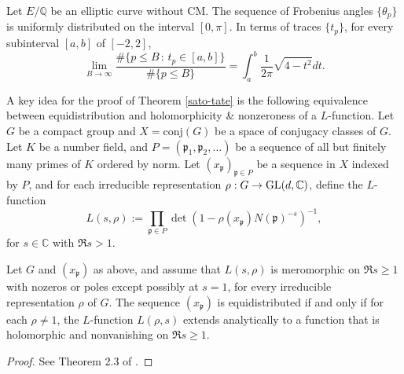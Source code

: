 \begin{theorem}
\label{sato-tate}
Let $E/\mathbb{Q}$ be an elliptic curve without CM.
The sequence of Frobenius angles $\{\theta_{p}\}$ is uniformly distributed on the
interval $[0, \pi]$. In terms of traces $\{t_{p}\}$, for every subinterval $[a, b]$ of $[-2, 2]$,
$$
\lim_{B\to \infty} \frac{\#\{p\leq B\,:\, t_{p} \in [a, b]\}}{\#\{p\leq B\}} = \int_{a}^{b} \frac{1}{2\pi} \sqrt{4 - t^{2}} dt.
$$
\end{theorem}

A key idea for the proof of Theorem \ref{sato-tate} is the following equivalence between 
equidistribution and holomorphicity \& nonzeroness of a $L$-function.
Let $G$ be a compact group and $X = \mathrm{conj}(G)$ be a space of
conjugacy classes of $G$. Let $K$ be a number field, and $P = (\mathfrak{p}_{1}, \mathfrak{p}_{2}, \dots)$
be a sequence of all but finitely many primes of $K$ ordered by norm.
Let $(x_{\mathfrak{p}})_{\mathfrak{p}\in P}$ be a sequence in $X$ indexed by $P$, and for each
irreducible representation $\rho: G \to \operatorname{\mathrm{GL}}(d, \mathbb{C})$, define the $L$-function
$$
L(s, \rho) := \prod_{\mathfrak{p}\in P} \det(1 - \rho(x_{\mathfrak{p}})N(\mathfrak{p})^{-s})^{-1},
$$
for $s\in \mathbb{C}$ with $\Re s > 1$.

\begin{theorem}
\label{equidistribution}
Let $G$ and $(x_{\mathfrak{p}})$ as above, and assume that $L(s, \rho)$ is meromorphic on $\Re s \geq 1$
with nozeros or poles except possibly at $s=1$, for every irreducible representation $\rho$ of $G$.
The sequence $(x_{\mathfrak{p}})$ is equidistributed if and only if for each $\rho \neq 1$, the $L$-function
$L(\rho, s)$ extends analytically to a function that is holomorphic and nonvanishing on $\Re s \geq 1$.
\end{theorem}
\begin{proof}
See Theorem 2.3 of \cite{fite2015equidistribution}.
\end{proof}


